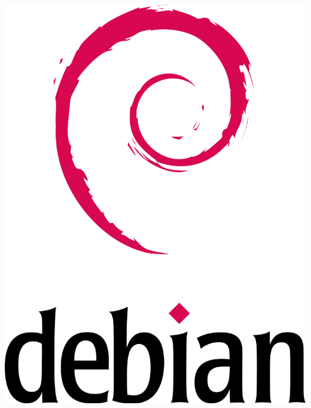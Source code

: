 \documentclass[9pt]{beamer}
\begin{document}
\begin{frame}
\begin{columns}
	\begin{column}{0.4\textwidth}
    \includegraphics[width=1.0\textwidth]{assets/debian.png} 
	\end{column}

 \end{columns}

\end{frame}
\end{document}
